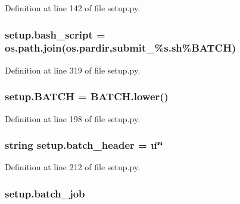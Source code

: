 Definition at line 142 of file setup.\+py.

\subsubsection[{\texorpdfstring{bash\+\_\+script}{bash_script}}]{\setlength{\rightskip}{0pt plus 5cm}setup.\+bash\+\_\+script = os.\+path.\+join(os.\+pardir,\textquotesingle{}submit\+\_\+\%s.\+sh\textquotesingle{}\%{\bf B\+A\+T\+CH})}\hypertarget{namespacesetup_a2331c56366b88428b33ad78c625cfcc8}{}\label{namespacesetup_a2331c56366b88428b33ad78c625cfcc8}


Definition at line 319 of file setup.\+py.

\subsubsection[{\texorpdfstring{B\+A\+T\+CH}{BATCH}}]{\setlength{\rightskip}{0pt plus 5cm}setup.\+B\+A\+T\+CH = B\+A\+T\+C\+H.\+lower()}\hypertarget{namespacesetup_a5c8a4998256b5c6d0700ac432fa75d4b}{}\label{namespacesetup_a5c8a4998256b5c6d0700ac432fa75d4b}


Definition at line 198 of file setup.\+py.

\subsubsection[{\texorpdfstring{batch\+\_\+header}{batch_header}}]{\setlength{\rightskip}{0pt plus 5cm}string setup.\+batch\+\_\+header = u\char`\"{}\char`\"{}}\hypertarget{namespacesetup_accce39b4aa713fbb290144ec68f888af}{}\label{namespacesetup_accce39b4aa713fbb290144ec68f888af}


Definition at line 212 of file setup.\+py.

\subsubsection[{\texorpdfstring{batch\+\_\+job}{batch_job}}]{\setlength{\rightskip}{0pt plus 5cm}setup.\+batch\+\_\+job}\hypertarget{namespacesetup_a86918b8c879471590485d8ac229362b2}{}\label{namespacesetup_a86918b8c879471590485d8ac229362b2}


